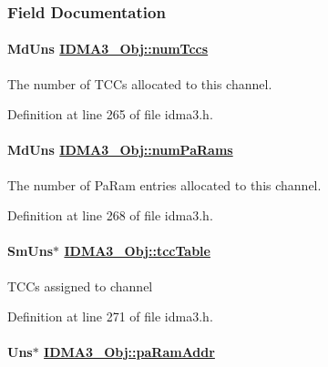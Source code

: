 \subsubsection{Field Documentation}
\hypertarget{struct_i_d_m_a3___obj_b9079f0696a344a620ea6d619a6e3d27}{
\paragraph[numTccs]{\setlength{\rightskip}{0pt plus 5cm}Md\-Uns \hyperlink{struct_i_d_m_a3___obj_b9079f0696a344a620ea6d619a6e3d27}{IDMA3\_\-Obj::num\-Tccs}}\hfill}
\label{struct_i_d_m_a3___obj_b9079f0696a344a620ea6d619a6e3d27}


The number of TCCs allocated to this channel. 

Definition at line 265 of file idma3.h.\hypertarget{struct_i_d_m_a3___obj_0448d6e17a54dd815b41da25363b5ff2}{
\paragraph[numPaRams]{\setlength{\rightskip}{0pt plus 5cm}Md\-Uns \hyperlink{struct_i_d_m_a3___obj_0448d6e17a54dd815b41da25363b5ff2}{IDMA3\_\-Obj::num\-Pa\-Rams}}\hfill}
\label{struct_i_d_m_a3___obj_0448d6e17a54dd815b41da25363b5ff2}


The number of Pa\-Ram entries allocated to this channel. 

Definition at line 268 of file idma3.h.\hypertarget{struct_i_d_m_a3___obj_de71e2d4ba3121cdb5c621a8749d51c3}{
\paragraph[tccTable]{\setlength{\rightskip}{0pt plus 5cm}Sm\-Uns$\ast$ \hyperlink{struct_i_d_m_a3___obj_de71e2d4ba3121cdb5c621a8749d51c3}{IDMA3\_\-Obj::tcc\-Table}}\hfill}
\label{struct_i_d_m_a3___obj_de71e2d4ba3121cdb5c621a8749d51c3}


TCCs assigned to channel 

Definition at line 271 of file idma3.h.\hypertarget{struct_i_d_m_a3___obj_61e6a45019fbc04e526cdd8cadbb6d59}{
\paragraph[paRamAddr]{\setlength{\rightskip}{0pt plus 5cm}Uns$\ast$ \hyperlink{struct_i_d_m_a3___obj_61e6a45019fbc04e526cdd8cadbb6d59}{IDMA3\_\-Obj::pa\-Ram\-Addr}}\hfill}
\label{struct_i_d_m_a3___obj_61e6a45019fbc04e526cdd8cadbb6d59}


